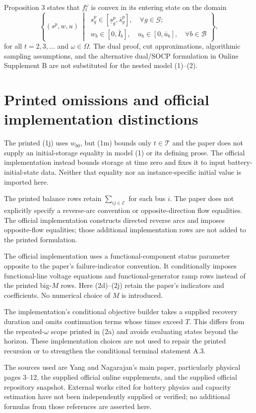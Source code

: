 \documentclass[10pt]{article}
\begin{document}
Proposition 3 states that $f_t^\omega$ is convex in its entering state on the domain
\[
\left\{(s^p,w,u)\ \middle|\
\begin{array}{l}
s_g^p\in[\underline s_g^p,\bar s_g^p],\quad\forall g\in\mathcal G;\\
w_b\in[0,\bar I_b],\quad u_b\in[0,\bar u_b],\quad\forall b\in\mathcal B
\end{array}\right\},
\]
for all $t=2,3,\ldots$ and $\omega\in\Omega$. The dual proof, cut approximations, algorithmic sampling assumptions, and the alternative dual/SOCP formulation in Online Supplement B are not substituted for the nested model (1)--(2).

\section*{Printed omissions and official implementation distinctions}
The printed (1j) uses $w_{b0}$, but (1m) bounds only $t\in\mathcal T$ and the paper does not supply an initial-storage equality in model (1) or its defining prose. The official implementation instead bounds storage at time zero and fixes it to input battery-initial-state data. Neither that equality nor an instance-specific initial value is imported here.

The printed balance rows retain $\sum_{ij\in\mathcal E}$ for each bus $i$. The paper does not explicitly specify a reverse-arc convention or opposite-direction flow equalities. The official implementation constructs directed reverse arcs and imposes opposite-flow equalities; those additional implementation rows are not added to the printed formulation.

The official implementation uses a functional-component status parameter opposite to the paper's failure-indicator convention. It conditionally imposes functional-line voltage equations and functional-generator ramp rows instead of the printed big-$M$ rows. Here (2d)--(2j) retain the paper's indicators and coefficients. No numerical choice of $M$ is introduced.

The implementation's conditional objective builder takes a supplied recovery duration and omits continuation terms whose times exceed $T$. This differs from the repeated-$\omega$ scope printed in (2a) and avoids evaluating states beyond the horizon. These implementation choices are not used to repair the printed recursion or to strengthen the conditional terminal statement A.3.

The sources used are Yang and Nagarajan's main paper, particularly physical pages 3--12, the supplied official online supplements, and the supplied official repository snapshot. External works cited for battery physics and capacity estimation have not been independently supplied or verified; no additional formulas from those references are asserted here.
\end{document}
